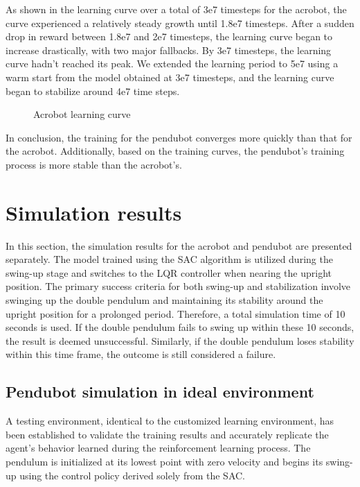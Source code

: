 As shown in the learning curve over a total of 3e7 timesteps for the acrobot, the curve experienced a relatively steady growth until 1.8e7 timesteps. After a sudden drop in reward between 1.8e7 and 2e7 timesteps, the learning curve began to increase drastically, with two major fallbacks. By 3e7 timesteps, the learning curve hadn't reached its peak. We extended the learning period to 5e7 using a warm start from the model obtained at 3e7 timesteps, and the learning curve began to stabilize around 4e7 time steps.

\begin{figure}[H]
    \centering
    \caption{Acrobot learning curve}
    \label{fig:image_b}
\end{figure}

In conclusion, the training for the pendubot converges more quickly than that for the acrobot. Additionally, based on the training curves, the pendubot's training process is more stable than the acrobot's.

\section{Simulation results}
In this section, the simulation results for the acrobot and pendubot are presented separately. The model trained using the SAC algorithm is utilized during the swing-up stage and switches to the LQR controller when nearing the upright position. The primary success criteria for both swing-up and stabilization involve swinging up the double pendulum and maintaining its stability around the upright position for a prolonged period. Therefore, a total simulation time of 10 seconds is used. If the double pendulum fails to swing up within these 10 seconds, the result is deemed unsuccessful. Similarly, if the double pendulum loses stability within this time frame, the outcome is still considered a failure.

\subsection{Pendubot simulation in ideal environment}
A testing environment, identical to the customized learning environment, has been established to validate the training results and accurately replicate the agent's behavior learned during the reinforcement learning process. The pendulum is initialized at its lowest point with zero velocity and begins its swing-up using the control policy derived solely from the SAC.

